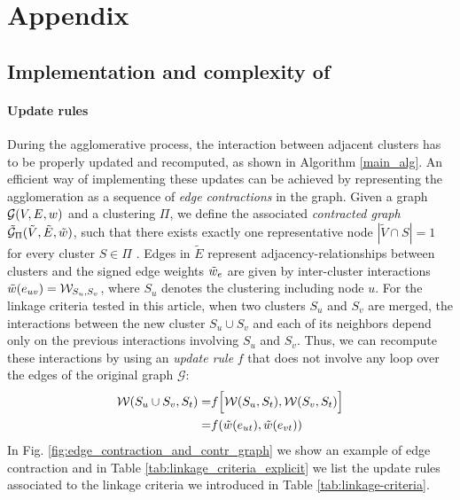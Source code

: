 
\renewcommand{\thesection}{A\arabic{section}}
\renewcommand{\thetable}{A\arabic{table}}
\renewcommand{\thefigure}{A\arabic{figure}}



\section{Appendix}

\subsection{Implementation and complexity of \algname{}} \label{sec:detailed_impl}

\paragraph*{Update rules} During the agglomerative process, the interaction between adjacent clusters has to be properly updated and recomputed, as shown in Algorithm \ref{main_alg}.  
An efficient way of implementing these updates can be achieved by representing the agglomeration as a sequence of \emph{edge contractions} in the graph. Given a graph $\mathcal{G}(V,E,w)$ and a clustering $\Pi$, we define the associated \emph{contracted graph} $\tilde{\mathcal{G}}_\Pi(\tilde{V}, \tilde{E}, \tilde{w})$, such that there exists exactly one representative node $|\tilde{V} \cap S| = 1$ for every cluster $S \in \Pi$ . Edges in $\tilde{E}$ represent adjacency-relationships between clusters 
and the signed edge weights $\tilde{w}_e$ are given by inter-cluster interactions $\tilde{w}(e_{uv})=\mathcal{W}_{S_u,S_v}$, where $S_u$ denotes the clustering including node $u$. 
For the linkage criteria tested in this article, when two clusters $S_u$ and $S_v$ are merged, the interactions between the new cluster $S_u \cup S_v$ and each of its neighbors depend only on the previous interactions involving $S_u$ and $S_v$. Thus, we can recompute these interactions by using an \emph{update rule} $f$ that does not involve any loop over the edges of the original graph $\mathcal{G}$:
\begin{align}
  \mathcal{W}(S_u \cup S_v,S_t) =& f\Big[ \mathcal{W}(S_u,S_t), \mathcal{W}(S_v,S_t) \Big] \\
  =& f(\tilde{w}(e_{ut}), \tilde{w}(e_{vt})) 
\end{align}
In Fig. \ref{fig:edge_contraction_and_contr_graph} we show an example of edge contraction and in Table \ref{tab:linkage_criteria_explicit} we list the update rules associated to the linkage criteria we introduced in Table \ref{tab:linkage-criteria}.

